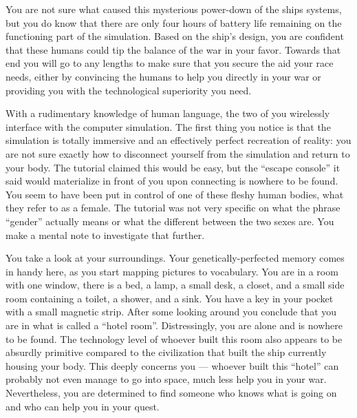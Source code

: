 \documentclass[char]{guildcamp1}
\begin{document}
You are not sure what caused this mysterious power-down of the ships systems, but you do know that there are only four hours of battery life remaining on the functioning part of the simulation.
Based on the ship's design, you are confident that these humans could tip the balance of the war in your favor. Towards that end you will go to any lengths to make sure that you secure the aid your race needs, either by convincing the humans to help you directly in your war or providing you with the technological superiority you need.

With a rudimentary knowledge of human language, the two of you wirelessly interface with the computer simulation. The first thing you notice is that the simulation is totally immersive and an effectively perfect recreation of reality: you are not sure exactly how to disconnect yourself from the simulation and return to your body. The tutorial claimed this would be easy, but the ``escape console'' it said would materialize in front of you upon connecting is nowhere to be found. You seem to have been put in control of one of these fleshy human bodies, what they refer to as a female. The tutorial was not very specific on what the phrase ``gender'' actually means or what the different between the two sexes are. You make a mental note to investigate that further.

You take a look at your surroundings. Your genetically-perfected memory comes in handy here, as you start mapping pictures to vocabulary. You are in a room with one window, there is a bed, a lamp, a small desk, a closet, and a small side room containing a toilet, a shower, and a sink. You have a key in your pocket with a small magnetic strip. After some looking around you conclude that you are in what is called a ``hotel room''. Distressingly, you are alone and \cPassive{\name} is nowhere to be found. The technology level of whoever built this room also appears to be absurdly primitive compared to the civilization that built the ship currently housing your body. This deeply concerns you --- whoever built this ``hotel'' can probably not even manage to go into space, much less help you in your war. Nevertheless, you are determined to find someone who knows what is going on and who can help you in your quest.
\end{document}
